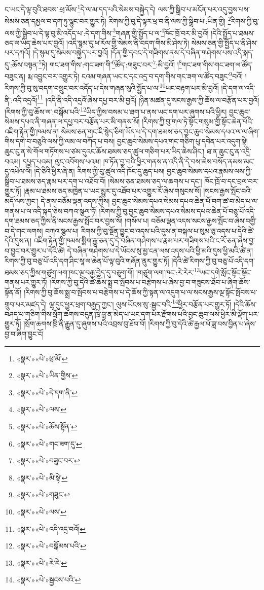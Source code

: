 ང་ཡང་དེ་ལྟ་བུའི་ཐབས་:ཕྲ་མོས་\footnote{«སྣར་»«པེ་»ཕྲ་མོ་}དེ་ལ་མ་དད་པའི་སེམས་བསྐྱེད་དེ། ལས་ཀྱི་སྒྲིབ་པ་མངོན་པར་འདུ་བྱས་པས་སེམས་ཅན་དམྱལ་བ་དག་ཏུ་ལྷུང་བར་གྱུར་ཏེ། རིགས་ཀྱི་བུ་དེ་ལྟར་ཕྲ་བ་ནི་ལས་ཀྱི་སྒྲིབ་པ་:ཡིན་གྱི། \footnote{«སྣར་»«པེ་»ཡིན་གྱིས་}རིགས་ཀྱི་བུ་ལས་ཀྱི་སྒྲིབ་པ་དེ་ལྟ་བུ་མི་འདོད་པ་:དེ་དག་གིས་\footnote{«སྣར་»«པེ་»དེ་དག་ནི་}གཞན་གྱི་སྤྱོད་པ་ལ་\footnote{«སྣར་»«པེ་»ལས་}ཁོང་ཁྲོ་བར་མི་བྱའོ། །དེའི་སྤྱོད་པ་ཐམས་ཅད་ལ་ཡིད་ཆེས་པར་བྱའོ། །འདི་སྙམ་དུ་ཕ་རོལ་གྱི་སེམས་ནི་བདག་གིས་མི་ཤེས་ཏེ། སེམས་ཅན་གྱི་སྤྱོད་པ་ནི་ཤེས་པར་དཀའོ། །དེ་སྙམ་དུ་སེམས་བསྐྱེད་པར་བྱའོ། །དོན་གྱི་དབང་དེ་གཟིགས་ནས་དེ་བཞིན་གཤེགས་པས་འདི་སྐད་དུ་:ཆོས་བསྟན་\footnote{«སྣར་»«པེ་»ཆོས་སྟོན་}ཏེ། གང་ཟག་གིས་:གང་ཟག་གི་\footnote{«སྣར་»«པེ་»གང་ཟག་དུ་}ཚོད་:གཟུང་བར་\footnote{«སྣར་»«པེ་»བཟུང་བར་}:མི་བྱའོ། །\footnote{«སྣར་»«པེ་»མི་སྟེ་}གང་ཟག་གིས་གང་ཟག་ལ་ཚོད་བཟུང་ན། རྨ་འབྱུང་བར་འགྱུར་ཏེ། ངའམ་གཞན་ཡང་ང་དང་འདྲ་བ་དག་གིས་གང་ཟག་ལ་ཚོད་བཟུང་\footnote{«སྣར་»«པེ་»གཟུང་}བའོ། །རིགས་ཀྱི་བུ་སུ་བདག་བསྲུང་བར་འདོད་པ་དེས་གཞན་སུའི་སྤྱོད་པ་ལ་\footnote{«སྣར་»«པེ་»ལས་}ཡང་བརྟག་པར་མི་བྱའོ། །དེ་དག་ལ་འདི་ནི་:འདི་འདྲའོ།\footnote{«སྣར་»«པེ་»འདི་འདྲ་བའོ།} །འདི་ནི་འདི་འདྲའོ་ཞེས་དཔྱ་བར་མི་བྱའོ། །ཉིན་མཚན་དུ་སངས་རྒྱས་ཀྱི་ཆོས་ལ་བརྩོན་པར་བྱའོ། །རིགས་ཀྱི་བུ་ཆོས་ལ་:བསྒོམ་པའི་\footnote{«སྣར་»«པེ་»བསྒོམས་པའི་}ཡིད་ཀྱིས་བསམ་པ་ཐག་པ་ནས་ཡང་དག་པར་ཞུགས་པའི་ཕྱིར། བྱང་ཆུབ་སེམས་དཔའ་ནི་གཞན་ལ་དཔྱ་བར་བརྩོན་པར་མི་གནས་སོ། །རིགས་ཀྱི་བུ་གལ་ཏེ་སྟོང་གསུམ་གྱི་སྟོང་ཆེན་པོའི་འཇིག་རྟེན་གྱི་ཁམས་ན། སེམས་ཅན་གང་ཇི་སྙེད་ཅིག་ཡོད་པ་དེ་དག་ཐམས་ཅད་བྱང་ཆུབ་སེམས་དཔའ་ལ་ལ་ཞིག་གིས་དགེ་བ་བཅུའི་ལས་ཀྱི་ལམ་ལ་བཀོད་པ་བས། བྱང་ཆུབ་སེམས་དཔའ་གང་གཅིག་པུ་དབེན་པར་འདུག་སྟེ། ཆུང་ངུ་ན་སེ་གོལ་གཏོགས་པ་ཙམ་དུའང་ཆོས་ཐམས་ཅད་ཚུལ་གཅིག་པར་ཡིད་ཆེས་ཤིང་། ཐ་ན་ཆུང་ངུ་ན་འདྲི་བའམ། དཔྱད་པའམ། ལུང་འབོགས་པའམ། ཁ་ཏོན་བྱ་བའི་ཕྱིར་གནས་ན་འདི་ནི་དེ་བས་ཆེས་བསོད་ནམས་མང་དུ་འཕེལ་ལོ། །དེ་ཅིའི་ཕྱིར་ཞེ་ན། རིགས་ཀྱི་བུ་ཚུལ་འདི་ཁོང་དུ་ཆུད་པས། བྱང་ཆུབ་སེམས་དཔའ་རྣམས་ལས་ཀྱི་སྒྲིབ་པ་ཐམས་ཅད་རྣམ་པར་དག་པ་འཐོབ་བོ། །སེམས་ཅན་ཐམས་ཅད་ལ་ཆགས་པ་དང་། ཁོང་ཁྲོ་བ་དང་བྲལ་བར་གྱུར་ཏོ། །རྣམ་པ་ཐམས་ཅད་མཁྱེན་པ་ཡང་མྱུར་དུ་འཐོབ་པར་འགྱུར་རོ་ཞེས་གསུངས་སོ། །སངས་རྒྱས་སྤོང་བའི་མདོ་ལས་ཀྱང་། དེ་ནས་བཅོམ་ལྡན་འདས་ཀྱིས། བྱང་ཆུབ་སེམས་དཔའ་སེམས་དཔའ་ཆེན་པོ་བག་ཚ་བ་མེད་པ་ལ་གནས་པ་ལ་འདི་སྐད་ཅེས་བཀའ་སྩལ་ཏོ། །རིགས་ཀྱི་བུ་བྱང་ཆུབ་སེམས་དཔའ་སེམས་དཔའ་ཆེན་པོ་བཅུ་པོ་འདི་དག་ཐམས་ཅད་ཀྱིས་ནི་སངས་རྒྱས་སྤོང་བར་བྱས་སོ། །གསོལ་པ། བཅོམ་ལྡན་འདས་སངས་རྒྱས་སྤོང་བ་ཞེས་བགྱི་བ་དེ་གང་ལགས། བཀའ་སྩལ་པ། རིགས་ཀྱི་བུ་སྔོན་བྱུང་བ་འདས་པའི་དུས་ན་བསྐལ་པ་སུམ་ཅུ་འདས་པ་དེའི་ཚེ་དེའི་དུས་ན། འཇིག་རྟེན་གྱི་ཁམས་སྨིག་རྒྱུ་ཅན་དུ་དེ་བཞིན་གཤེགས་པ་རྣམ་པར་གཟིགས་པའི་ང་རོ་ཅན་ཞེས་བྱ་བ་བྱུང་བར་གྱུར་པ་དེའི་ཚེ། དེ་བཞིན་གཤེགས་པ་དེ་ཡོངས་སུ་མྱ་ངན་ལས་འདས་པའི་ཕྱི་མའི་དུས་ཕྱི་མའི་ཚེ་ན། རིགས་ཀྱི་བུ་བཅུ་པོ་འདི་དག་ཤིང་སཱ་ལ་ཆེན་པོ་ལྟ་བུའི་གཞོན་ནུར་གྱུར་ཏོ། །དེའི་ཚེ་རིགས་ཀྱི་བུ་བཅུ་པོ་འདི་དག་ཐམས་ཅད་ཀྱིས་གཙུག་ལག་ཁང་ལྔ་བརྒྱ་བྱེད་དུ་བཅུག་གོ། །གཙུག་ལག་ཁང་:རེ་རེར་\footnote{«སྣར་»«པེ་»རེ་རེ་}ཡང་དགེ་སློང་སྟོང་སྟོང་གནས་པར་གྱུར་ཏོ། །རིགས་ཀྱི་བུ་དེའི་ཚེ་ཆོས་སྨྲ་བ་སྤོབས་པ་བརྩེགས་པ་ཞེས་བྱ་བ་གཟུངས་ཐོབ་པ་ཞིག་ཆོས་སྟོན་ནོ། །རིགས་ཀྱི་བུ་ཆོས་སྨྲ་བ་སྤོབས་པ་བརྩེགས་པ་དེ་ཆོས་ཀྱི་སྟན་ལ་འདུག་པ་ལ་སངས་རྒྱས་ལྔ་སྟོང་སྤོབས་པ་གྲུབ་པར་མཛད་དེ། ལྷ་དུང་ཕྱུར་ཕྲག་བརྒྱད་ཀྱང་། ལུས་ཡོངས་སུ་:སྦྱང་བའི་\footnote{«སྣར་»«པེ་»སྦྱངས་པའི་}ཕྱིར་བརྩོན་པར་གྱུར་ཏོ། །དེའི་ཆོས་བཤད་པ་གཅིག་གིས་སྲོག་ཆགས་བདུན་ཁྲི་བླ་ན་མེད་པ་ཡང་དག་པར་རྫོགས་པའི་བྱང་ཆུབ་ལས་ཕྱིར་མི་ལྡོག་པར་གྱུར་ཏོ། །སྲོག་ཆགས་ཁྲི་ནི་རྒྱུན་དུ་ཞུགས་པའི་འབྲས་བུ་ཐོབ་བོ། །རིགས་ཀྱི་བུ་དེའི་ཚེ་རྒྱལ་པོ་ཟླ་བས་བྱིན་པ་ཞེས་བྱ་བ་ཞིག་བྱུང་ངོ། 